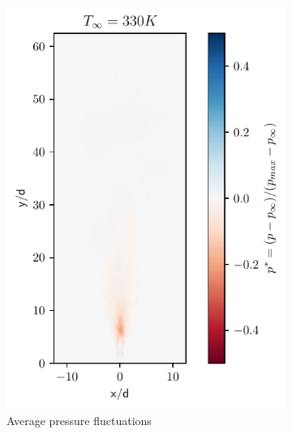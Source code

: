 \begin{figure}[htbp!]
\begin{subfigure}{0.25\textwidth}
	\includegraphics[scale=.65]{figures/Plots/vertical/330/pressure_scaled_vert_avg_330.pdf}
	\caption{Average pressure fluctuations} \label{330_pressure_3}
\end{subfigure}
\hfill
\begin{subfigure}{0.25\textwidth}
	\centering

\end{subfigure}
\end{figure}
